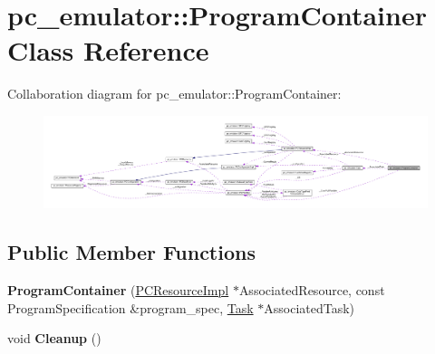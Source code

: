 \hypertarget{classpc__emulator_1_1ProgramContainer}{}\section{pc\+\_\+emulator\+:\+:Program\+Container Class Reference}
\label{classpc__emulator_1_1ProgramContainer}


Collaboration diagram for pc\+\_\+emulator\+:\+:Program\+Container\+:\nopagebreak
\begin{figure}[H]
\begin{center}
\leavevmode
\includegraphics[width=350pt]{classpc__emulator_1_1ProgramContainer__coll__graph}
\end{center}
\end{figure}
\subsection*{Public Member Functions}
\begin{DoxyCompactItemize}
\item 
{\bfseries Program\+Container} (\hyperlink{classpc__emulator_1_1PCResourceImpl}{P\+C\+Resource\+Impl} $\ast$Associated\+Resource, const Program\+Specification \&program\+\_\+spec, \hyperlink{classpc__emulator_1_1Task}{Task} $\ast$Associated\+Task)\hypertarget{classpc__emulator_1_1ProgramContainer_acb64b6652f369220980eb47dfb047c5e}{}\label{classpc__emulator_1_1ProgramContainer_acb64b6652f369220980eb47dfb047c5e}

\item 
void {\bfseries Cleanup} ()\hypertarget{classpc__emulator_1_1ProgramContainer_a83a369d4f9345d3b8ceba6147f6d87d5}{}\label{classpc__emulator_1_1ProgramContainer_a83a369d4f9345d3b8ceba6147f6d87d5}

\end{DoxyCompactItemize}
